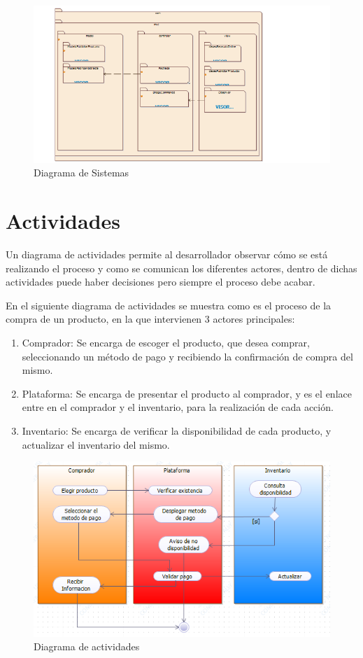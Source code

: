 \begin{figure}[h!]
	\centering
	\includegraphics[width=0.9\linewidth]{arquitectura/imagenes/DiagramaDeSistemas}
	\caption{Diagrama de Sistemas}
\end{figure}


\newpage

\section{Actividades}
Un diagrama de actividades permite al desarrollador observar cómo se está realizando el proceso y como se comunican los diferentes actores, dentro de dichas actividades puede haber decisiones pero siempre el proceso debe acabar.

En el siguiente diagrama de actividades se muestra como es el proceso de la compra de un producto, en la que intervienen 3 actores principales:
\begin{enumerate}
	\item Comprador: Se encarga de escoger el producto, que desea comprar, seleccionando un método de pago y recibiendo la confirmación de compra del mismo.
	\item Plataforma: Se encarga de presentar el producto al comprador, y es el enlace entre en el comprador y el inventario, para la realización de cada acción.
	\item Inventario: Se encarga de verificar la disponibilidad de cada producto, y actualizar el inventario del mismo.
\end{enumerate}

\begin{figure}[th!]
	\centering
	\includegraphics[width=1\linewidth]{arquitectura/imagenes/workflow}
	\caption{Diagrama de actividades}
	\label{fig:workflow}
\end{figure}

